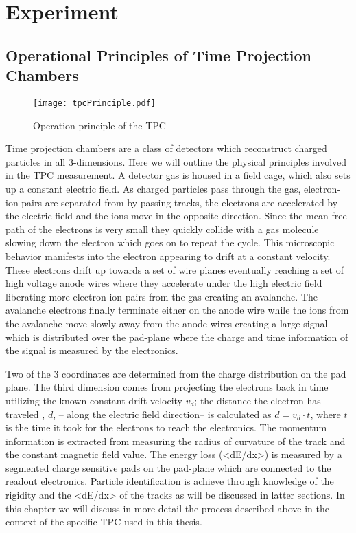 \chapter{Experiment}

\section{Operational Principles of Time Projection Chambers}


\begin{figure}
\texttt{[image: tpcPrinciple.pdf]}
\label{fig:tpcPrinciple}
\caption{Operation principle of the TPC}
\end{figure}
Time projection chambers are a class of detectors which reconstruct charged particles in all 3-dimensions. Here we will outline the physical principles involved in the TPC measurement. A detector gas is housed in a field cage, which also sets up a constant electric field. As charged particles pass through the gas, electron-ion pairs are separated from by passing tracks, the electrons are accelerated by the electric field and the ions move in the opposite direction. Since the mean free path of the electrons is very small they quickly collide with a gas molecule slowing down the electron which goes on to repeat the cycle. This microscopic behavior manifests into the electron appearing to drift at a constant velocity. These electrons drift up towards a set of wire planes eventually reaching a set of high voltage anode wires where they accelerate under the high electric field liberating more electron-ion pairs from the gas creating an avalanche. The avalanche electrons finally terminate either on the anode wire while the ions from the avalanche move slowly away from the anode wires creating a large signal which is distributed over the pad-plane where the charge and time information of the signal is measured by the  electronics. 

Two of the 3 coordinates are determined from the charge distribution on the pad plane. The third dimension comes from projecting the electrons back in time utilizing the known constant drift velocity $v_d$; the distance the electron has traveled , $d$, -- along the electric field direction-- is calculated as $d = v_d \cdot t$, where $t$ is the time it took for the electrons to reach the electronics. The momentum information is extracted from measuring the radius of curvature of the track and the constant magnetic field value. The energy loss (<dE/dx>) is measured by a segmented charge sensitive pads on the pad-plane which are connected to the readout electronics. Particle identification is achieve through knowledge of the rigidity and the <dE/dx> of the tracks as will be discussed in latter sections. In this chapter we will discuss in more detail the process described above in the context of the specific TPC used in this thesis. 

